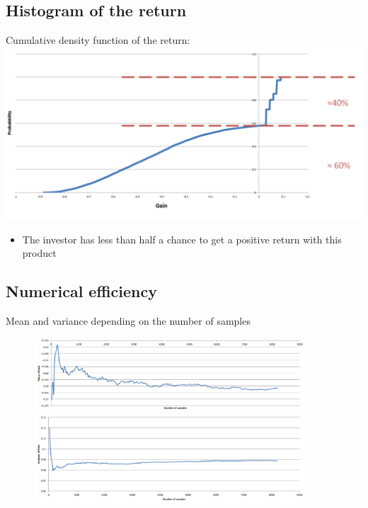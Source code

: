 \subsection{Histogram of the return}
\begin{frame}
\myframetitle{}
Cumulative density function of the return: \\
\vspace{0.5cm}
\centering
\includegraphics[width=0.9\linewidth]{../Report/Gain}
\begin{itemize}
\item The investor has less than half a chance to get a positive return with this product
\end{itemize}
\end{frame}



\subsection{Numerical efficiency}
\begin{frame}
\myframetitle{}
Mean and variance depending on the number of samples
\begin{figure}
	\centering
	\includegraphics[width=0.9\textwidth]{../Report/Mean_of_the_gain} \\
	\includegraphics[width=0.9\textwidth]{../Report/Variance_of_the_gain}
\end{figure}
\end{frame}

